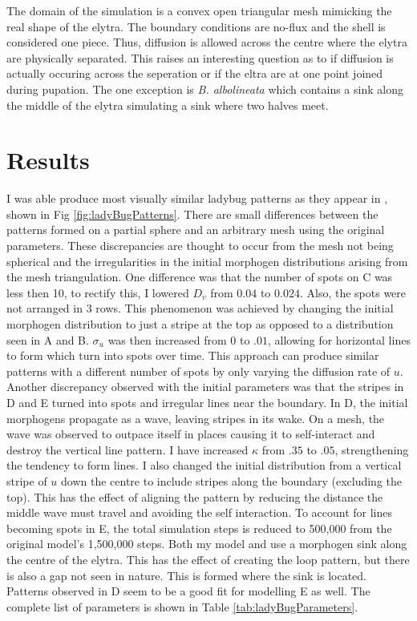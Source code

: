 The domain of the simulation is a convex open triangular mesh mimicking the real shape of the elytra. The boundary conditions are no-flux and the shell is considered one piece. Thus, diffusion is allowed across the centre where the elytra are physically separated. This raises an interesting question as to if diffusion is actually occuring across the seperation or if the eltra are at one point joined during pupation. The one exception is \textit{B. albolineata} which contains a sink along the middle of the elytra simulating a sink where two halves meet.

\section{Results}
I was able produce most visually similar ladybug patterns as they appear in \cite{Liaw2001}, shown in Fig \ref{fig:ladyBugPatterns}. There are small differences between the patterns formed on a partial sphere and an arbitrary mesh using the original parameters. These discrepancies are thought to occur from the mesh not being spherical and the irregularities in the initial morphogen distributions arising from the mesh triangulation. One difference was that the number of spots on C was less then 10, to rectify this, I lowered $D_v$ from $0.04$ to $0.024$. Also, the spots were not arranged in 3 rows. This phenomenon was achieved by changing the initial morphogen distribution to just a stripe at the top as opposed to a distribution seen in A and B. $\sigma_u$ was then increased from $0$ to $.01$, allowing for horizontal lines to form which turn into spots over time. This approach can produce similar patterns  with a different number of spots by only varying the diffusion rate of $u$. Another discrepancy observed with the initial parameters was that the stripes in D and E turned into spots and irregular lines near the boundary. In D, the initial morphogens propagate as a wave, leaving stripes in its wake. On a mesh, the wave was observed to outpace itself in places causing it to self-interact and destroy the vertical line pattern. I have increased $\kappa$ from $.35$ to $.05$, strengthening the tendency to form lines. I also changed the initial distribution from a vertical stripe of $u$ down the centre to include stripes along the boundary (excluding the top). This has the effect of aligning the pattern by reducing the distance the middle wave must travel and avoiding the self interaction. To account for lines becoming spots in E, the total simulation steps is reduced to 500,000 from the original model's 1,500,000 steps. Both my model and \cite{Liaw2001} use a morphogen sink along the centre of the elytra. This has the effect of creating the loop pattern, but there is also a gap not seen in nature. This is formed where the sink is located. Patterns observed in D seem to be a good fit for modelling E as well. The complete list of parameters is shown in Table \ref{tab:ladyBugParameters}.

